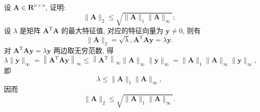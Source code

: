  \begin{tcolorbox}[enhanced,colback=10,colframe=9,breakable,coltitle=green!25!black,title=2024]
设 $ \boldsymbol{A} \in \mathbf{R}^{n \times n} $, 证明:
$$
\|\boldsymbol{A}\|_{2} \leqslant \sqrt{\|\boldsymbol{A}\|_{1}\|\boldsymbol{A}\|_{\infty}} ;
$$
 \tcblower
设 $ \lambda $ 是矩阵 $ \boldsymbol{A}^{\mathrm{T}} \boldsymbol{A} $ 的最大特征值, 对应的特征向量为 $ \boldsymbol{y} \neq 0 $, 则有
$$
\|\boldsymbol{A}\|_{2}=\sqrt{\lambda}, \boldsymbol{A}^{\mathrm{T}} \boldsymbol{A} \boldsymbol{y}=\lambda \boldsymbol{y} .
$$
对 $ \boldsymbol{A}^{\mathrm{T}} \boldsymbol{A} \boldsymbol{y}=\lambda \boldsymbol{y} $ 两边取无穷范数, 得
$$
\lambda\|\boldsymbol{y}\|_{\infty}=\left\|\boldsymbol{A}^{\mathrm{T}} \boldsymbol{A} \boldsymbol{y}\right\|_{\infty} \leqslant\left\|\boldsymbol{A}^{\mathrm{T}}\right\|_{\infty}\|\boldsymbol{A}\|_{\infty}\|\boldsymbol{y}\|_{\infty}=\|\boldsymbol{A}\|_{1}\|\boldsymbol{A}\|_{\infty}\|\boldsymbol{y}\|_{\infty},
$$
即
$$
\lambda \leqslant\|\boldsymbol{A}\|_{1}\|\boldsymbol{A}\|_{\infty},
$$
因而
$$
\|\boldsymbol{A}\|_{2} \leqslant \sqrt{\|\boldsymbol{A}\|_{1}\|\boldsymbol{A}\|_{\infty}} .
$$

 \end{tcolorbox}


